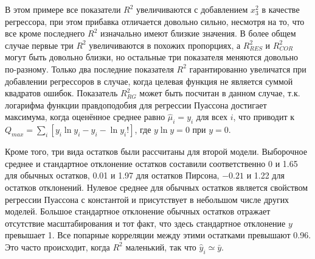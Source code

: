 В этом примере все показатели $R^2$ увеличиваются с добавлением $x_3^2$ в качестве регрессора, при этом прибавка отличается довольно сильно, несмотря на то, что все кроме последнего $R^2$ изначально имеют близкие значения. В более общем случае первые три $R^2$ увеличиваются в похожих пропорциях, а $R_{RES}^2$ и $R_{COR}^2$ могут быть довольно близки, но остальные три показателя меняются довольно по-разному. Только два последние показателя $R^2$ гарантированно увеличатся при добавлении регрессоров в случае, когда целевая функция не является суммой квадратов ошибок. Показатель $R_{RG}^2$ может быть посчитан в данном случае, т.к.  логарифма функции правдоподобия для регрессии Пуассона достигает максимума, когда оценённое среднее равно $\hat{\mu}_i = y_i$ для всех $i$, что приводит к $Q_{max} = \sum_i [y_i\ln y_i - y_i - \ln y_i!]$, где $y\ln y = 0$ при $y = 0$.

Кроме того, три вида остатков были рассчитаны для второй модели. Выборочное среднее и стандартное отклонение остатков составили соответственно 0 и 1.65 для обычных остатков, 0.01 и 1.97 для остатков Пирсона, $- 0.21$ и 1.22 для остатков отклонений. Нулевое среднее для обычных остатков является свойством регрессии Пуассона с константой и присутствует в небольшом числе других моделей. Большое стандартное отклонение обычных остатков отражает отсутствие масштабирования и тот факт, что здесь стандартное отклонение $y$ превышает 1. Все попарные корреляции между этими остатками превышают 0.96. Это часто происходит, когда $R^2$ маленький, так что  $\hat{y}_i \simeq \bar{y}$.


